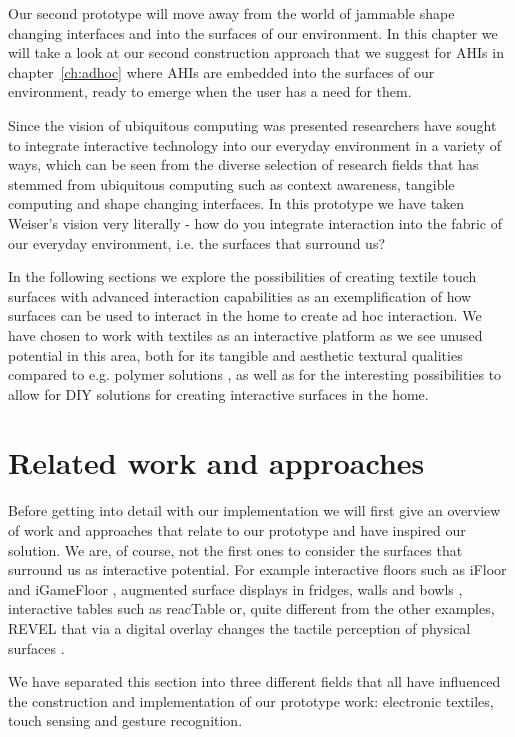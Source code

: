 Our second prototype will move away from the world of jammable shape changing interfaces and into the surfaces of our environment.
In this chapter we will take a look at our second construction approach that we suggest for AHIs in chapter~\ref{ch:adhoc} where AHIs are embedded into the surfaces of our environment, ready to emerge when the user has a need for them.

Since the vision of ubiquitous computing was presented researchers have sought to integrate interactive technology into our everyday environment in a variety of ways, which can be seen from the diverse selection of research fields that has stemmed from ubiquitous computing such as context awareness, tangible computing and shape changing interfaces.
In this prototype we have taken Weiser's vision very literally - how do you integrate interaction into the fabric of our everyday environment, i.e. the surfaces that surround us?

In the following sections we explore the possibilities of creating textile touch surfaces with advanced interaction capabilities as an exemplification of how surfaces can be used to interact in the home to create ad hoc interaction.
We have chosen to work with textiles as an interactive platform as we see unused potential in this area, both for its tangible and aesthetic textural qualities compared to e.g. polymer solutions \cite{rosenberg2009unmousepad}, as well as for the interesting possibilities to allow for DIY solutions for creating interactive surfaces in the home.

\section{Related work and approaches}
Before getting into detail with our implementation we will first give an overview of work and approaches that relate to our prototype and have inspired our solution.
We are, of course, not the first ones to consider the surfaces that surround us as interactive potential.
For example interactive floors such as iFloor \citep{petersen2005floor} and  iGameFloor \citep{gronbaek2007igamefloor}, augmented surface displays in fridges, walls and bowls \citep{taylor2007homes}, interactive tables such as reacTable \citep{jorda2007reactable} or, quite different from the other examples, REVEL that via a digital overlay changes the tactile perception of physical surfaces \citep{bau2013revel}.

We have separated this section into three different fields that all have influenced the construction and implementation of our prototype work: electronic textiles, touch sensing and gesture recognition.
 
